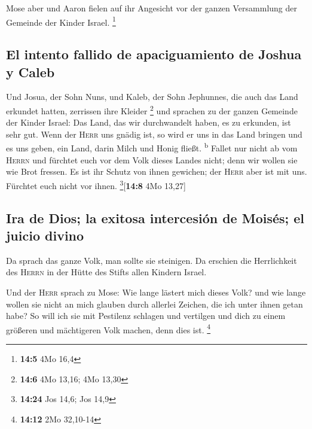  Mose aber und Aaron fielen auf ihr Angesicht vor der
ganzen Versammlung der Gemeinde der Kinder Israel. \footnote{\textbf{14:5}
  4Mo 16,4}

\hypertarget{el-intento-fallido-de-apaciguamiento-de-joshua-y-caleb}{%
\subsection{El intento fallido de apaciguamiento de Joshua y
Caleb}\label{el-intento-fallido-de-apaciguamiento-de-joshua-y-caleb}}

 Und Josua, der Sohn Nuns, und Kaleb, der Sohn Jephunnes,
die auch das Land erkundet hatten, zerrissen ihre Kleider \footnote{\textbf{14:6}
  4Mo 13,16; 4Mo 13,30}  und sprachen zu der ganzen
Gemeinde der Kinder Israel: Das Land, das wir durchwandelt haben, es zu
erkunden, ist sehr gut.  Wenn der \textsc{Herr} uns gnädig
ist, so wird er uns in das Land bringen und es uns geben, ein Land,
darin Milch und Honig fließt. \textsuperscript{b}  Fallet
nur nicht ab vom \textsc{Herrn} und fürchtet euch vor dem Volk dieses
Landes nicht; denn wir wollen sie wie Brot fressen. Es ist ihr Schutz
von ihnen gewichen; der \textsc{Herr} aber ist mit uns. Fürchtet euch
nicht vor ihnen. \footnote{\textbf{14:24} Jos 14,6; Jos 14,9}{[}\textbf{14:8}
4Mo 13,27{]}

\hypertarget{ira-de-dios-la-exitosa-intercesiuxf3n-de-moisuxe9s-el-juicio-divino}{%
\subsection{Ira de Dios; la exitosa intercesión de Moisés; el juicio
divino}\label{ira-de-dios-la-exitosa-intercesiuxf3n-de-moisuxe9s-el-juicio-divino}}

 Da sprach das ganze Volk, man sollte sie steinigen. Da
erschien die Herrlichkeit des \textsc{Herrn} in der Hütte des Stifts
allen Kindern Israel.

 Und der \textsc{Herr} sprach zu Mose: Wie lange lästert
mich dieses Volk? und wie lange wollen sie nicht an mich glauben durch
allerlei Zeichen, die ich unter ihnen getan habe?  So
will ich sie mit Pestilenz schlagen und vertilgen und dich zu einem
größeren und mächtigeren Volk machen, denn dies ist. \footnote{\textbf{14:12}
  2Mo 32,10-14}


